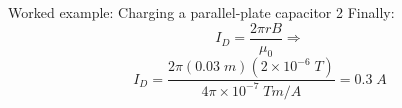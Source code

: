 {\begin{frame}{Worked example: Charging a parallel-plate capacitor 2}
  Finally:
  \begin{equation*}
    I_D = \frac{2\pi r B}{\mu_0} \Rightarrow
  \end{equation*}
  \begin{equation*}
    I_D =
      \frac{2\pi(0.03\;m)(2 \times 10^{-6} \; T)}{4\pi \times 10^{-7}\; Tm/A} =
      0.3 \; A
  \end{equation*}

\end{frame}

} %
